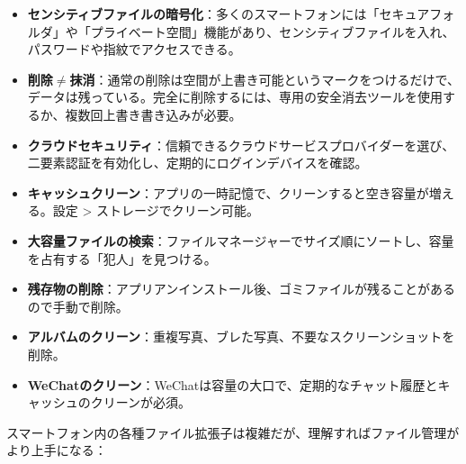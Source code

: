 
\begin{itemize}
  \item \textbf{センシティブファイルの暗号化}：多くのスマートフォンには「セキュアフォルダ」や「プライベート空間」機能があり、センシティブファイルを入れ、パスワードや指紋でアクセスできる。
  \item \textbf{削除$\neq$抹消}：通常の削除は空間が上書き可能というマークをつけるだけで、データは残っている。完全に削除するには、専用の安全消去ツールを使用するか、複数回上書き書き込みが必要。
  \item \textbf{クラウドセキュリティ}：信頼できるクラウドサービスプロバイダーを選び、二要素認証を有効化し、定期的にログインデバイスを確認。
\end{itemize}


\begin{itemize}
  \item \textbf{キャッシュクリーン}：アプリの一時記憶で、クリーンすると空き容量が増える。設定 > ストレージでクリーン可能。
  \item \textbf{大容量ファイルの検索}：ファイルマネージャーでサイズ順にソートし、容量を占有する「犯人」を見つける。
  \item \textbf{残存物の削除}：アプリアンインストール後、ゴミファイルが残ることがあるので手動で削除。
  \item \textbf{アルバムのクリーン}：重複写真、ブレた写真、不要なスクリーンショットを削除。
  \item \textbf{WeChatのクリーン}：WeChatは容量の大口で、定期的なチャット履歴とキャッシュのクリーンが必須。
\end{itemize}


スマートフォン内の各種ファイル拡張子は複雑だが、理解すればファイル管理がより上手になる：

